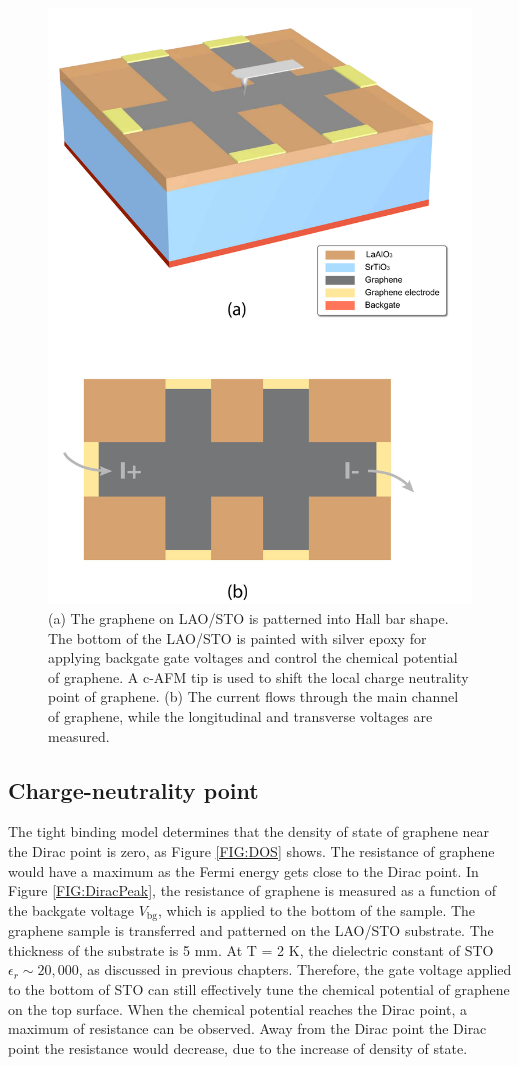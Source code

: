 \documentclass[pdflatex, sectionletters, 12pt]{pittetd}    %
\begin{document}
\begin{figure}[p]
	\centering
	\includegraphics[width=.7\textwidth]{Drawing/HallDevice.pdf}
	\caption{(a) The graphene on LAO/STO is patterned into Hall bar shape. The bottom of the LAO/STO is painted with silver epoxy for applying backgate gate voltages and control the chemical potential of graphene. A c-AFM tip is used to shift the local charge neutrality point of graphene. (b) The current flows through the main channel of graphene, while the longitudinal and transverse voltages are measured.}
	\label{FIG:HallDevice}
\end{figure}

\subsection{Charge-neutrality point}

The tight binding model determines that the density of state of graphene near the Dirac point is zero\cite{neto2009electronic}, as Figure \ref{FIG:DOS} shows. The resistance of graphene would have a maximum as the Fermi energy gets close to the Dirac point. In Figure \ref{FIG:DiracPeak}, the resistance of graphene is measured as a function of the backgate voltage $V_\mathrm{bg}$, which is applied to the bottom of the sample. The graphene sample is transferred and patterned on the LAO/STO substrate. The thickness of the substrate is 5 mm. At T = 2 K, the dielectric constant of STO $\epsilon_r \sim 20,000$, as discussed in previous chapters. Therefore, the gate voltage applied to the bottom of STO can still effectively tune the chemical potential of graphene on the top surface. When the chemical potential reaches the Dirac point, a maximum of resistance can be observed. Away from the Dirac point the Dirac point the resistance would decrease, due to the increase of density of state. 
\\
\end{document}
